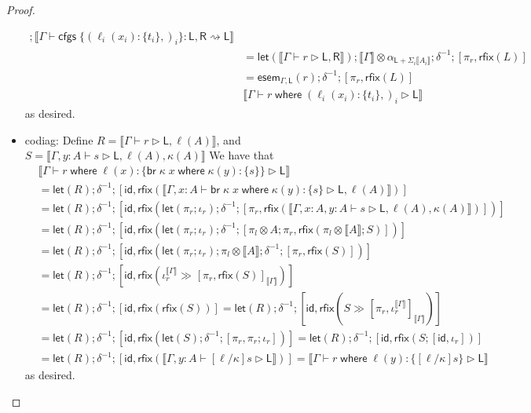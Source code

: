 \documentclass[acmsmall,screen,review]{acmart}
\newcommand{\ms}[1]{\ensuremath{\mathsf{#1}}}
\newcommand{\lto}{:}
\newcommand{\brb}[2]{\ms{br}\;#1\;#2}
\newcommand{\where}[2]{#1\;\ms{where}\;#2}
\newcommand{\wbranch}[3]{#1(#2) \lto \{#3\}}
\newcommand{\cfgsubst}[1]{\ms{cfgs}\;\{#1\}}
\newcommand{\bhyp}[2]{#1 : #2}
\newcommand{\haslb}[3]{#1 \vdash #2 \rhd #3}
\newcommand{\lbsubst}[4]{#1 \vdash #2: #3 \rightsquigarrow #4}
\newcommand{\brle}[1]{{\textsf{#1}}}
\newcommand{\dnt}[1]{\llbracket{#1}\rrbracket}
\newcommand{\entrymor}[3]{\ms{esem}_{#1, #3}(#2)}
\newcommand{\lmor}[1]{\ms{let}(#1)}
\newcommand{\rfix}[1]{\ms{rfix}(#1)}
\newcommand{\rseq}[3]{#2 \gg_{#1} #3}
\newcommand{\envcop}[3]{[#2, #3]_{#1}}
\newcommand{\envinr}[1]{\iota^{#1}_{r}}
\begin{document}
\begin{proof}
\begin{itemize}[leftmargin=*]
\begin{equation}
\begin{aligned}
          ; \dnt{
            \lbsubst{\Gamma}
              {\cfgsubst{(\wbranch{\ell_i}{x_i}{t_i},)_i}}{\ms{L}, \ms{R}}{\ms{L}}
          } \\
        & = \lmor{\dnt{\haslb{\Gamma}{r}{\ms{L}, \ms{R}}}}
          ; \dnt{\Gamma} \otimes \alpha_{\ms{L} + \Sigma_i\dnt{A_i}}; \delta^{-1} 
          ; [\pi_r, \rfix{L}] \\
        & = \entrymor{\Gamma}{r}{\ms{L}}; \delta^{-1} ; [\pi_r, \rfix{L}] \\
        & \dnt{\haslb{\Gamma}{\where{r}{(\wbranch{\ell_i}{x_i}{t_i},)_i}}{\ms{L}}}
      \end{aligned}
    \end{equation}
    as desired.
    \item \brle{codiag}: 
    Define $R = \dnt{\haslb{\Gamma}{r}{\ms{L}, \ell(A)}}$, and %
           $S = \dnt{\haslb{\Gamma, \bhyp{y}{A}}{s}{\ms{L}, \ell(A), \kappa(A)}}$ %
    We have that
    \begin{equation}
      \begin{aligned}
      & \dnt{\haslb{\Gamma}
        {\where{r}{\wbranch{\ell}{x}{\where{\brb{\kappa}{x}}{\wbranch{\kappa}{y}{s}}}}}{\ms{L}}} \\
      & = \lmor{R} ; \delta^{-1} ; [\ms{id}, 
        \rfix{\dnt{\haslb{\Gamma, \bhyp{x}{A}}
          {\where{\brb{\kappa}{x}}{\wbranch{\kappa}{y}{s}}}{\ms{L}, \ell(A)}}}] \\
      & = \lmor{R} ; \delta^{-1} ; [\ms{id}, 
        \rfix{\lmor{\pi_r ; \iota_r} ; \delta^{-1} 
            ; [\pi_r, 
            \rfix{\dnt{\haslb{\Gamma, \bhyp{x}{A}, \bhyp{y}{A}}{s}{\ms{L}, \ell(A), \kappa(A)}}}]
          }] \\
      & = \lmor{R} ; \delta^{-1} ; [\ms{id}, 
        \rfix{\lmor{\pi_r ; \iota_r} ; \delta^{-1} 
            ; [\pi_l \otimes A ; \pi_r, 
            \rfix{\pi_l \otimes \dnt{A} ; S}]
          }] \\
      & = \lmor{R} ; \delta^{-1} ; [\ms{id}, 
        \rfix{\lmor{\pi_r ; \iota_r} ; \pi_l \otimes \dnt{A} ; \delta^{-1} ; [\pi_r, \rfix{S}]
          }] \\
      & = \lmor{R} ; \delta^{-1} ; [\ms{id}, 
          \rfix{\rseq{}{\envinr{\dnt{\Gamma}}}{\envcop{\dnt{\Gamma}}{\pi_r}{\rfix{S}}}}] \\
      & = \lmor{R} ; \delta^{-1} ; [\ms{id}, \rfix{\rfix{S}}]
        = \lmor{R} ; \delta^{-1} ; 
          [\ms{id}, \rfix{\rseq{}{S}{\envcop{\dnt{\Gamma}}{\pi_r}{\envinr{\dnt{\Gamma}}}}}] \\
      & = \lmor{R} ; \delta^{-1} ; 
          [\ms{id}, \rfix{\lmor{S} ; \delta^{-1} ; [\pi_r, \pi_r ; \iota_r]}]
        = \lmor{R} ; \delta^{-1} ; 
          [\ms{id}, \rfix{S ; [\ms{id}, \iota_r]}] \\
      & = \lmor{R} ; \delta^{-1} ; 
      [\ms{id}, \rfix{\dnt{\haslb{\Gamma, \bhyp{y}{A}}{[\ell/\kappa]s}{\ms{L}}}}]
        = \dnt{\haslb{\Gamma}{\where{r}{\wbranch{\ell}{y}{[\ell/\kappa]s}}}{\ms{L}}}
      \end{aligned}
    \end{equation}
    as desired.


\end{itemize}
\end{proof}
\end{document}

